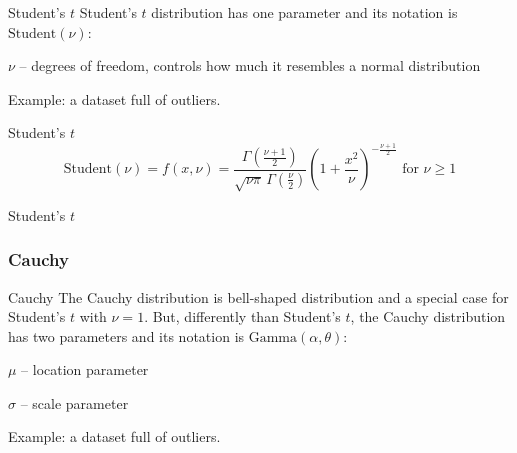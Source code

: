 \begin{frame}{Student's $t$}
	Student's $t$ distribution has one parameter and its notation is
	$\text{Student}(\nu)$:
	\begin{vfilleditems}
		\item $\nu$ -- degrees of freedom, controls how much it resembles a normal distribution
	\end{vfilleditems}
	\vfill
	Example: a dataset full of outliers.
\end{frame}

\begin{frame}{Student's $t$}
	$$\text{Student}(\nu) = f(x, \nu) = \frac{\Gamma \left(\frac{\nu+1}{2} \right)} {\sqrt{\nu\pi}\,\Gamma \left(\frac{\nu}{2} \right)} \left(1+\frac{x^2}{\nu} \right)^{-\frac{\nu+1}{2}} \text{ for $\nu \geq 1$}$$
\end{frame}

\begin{frame}{Student's $t$}
	\centering
\end{frame}

\subsubsection{Cauchy}
\begin{frame}{Cauchy}
	The Cauchy distribution is bell-shaped distribution and a special case for Student's $t$ with $\nu=1$.
	\vfill
	But, differently than Student's $t$, the Cauchy distribution has two parameters and its notation is
	$\text{Gamma}(\alpha, \theta)$:
	\begin{vfilleditems}
		\item $\mu$ -- location parameter
		\item $\sigma$ -- scale parameter
	\end{vfilleditems}
	\vfill
	Example: a dataset full of outliers.
\end{frame}

